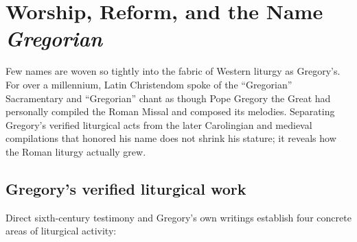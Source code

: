 \section{Worship, Reform, and the Name \emph{Gregorian}}

Few names are woven so tightly into the fabric of Western liturgy as Gregory's.
For over a millennium, Latin Christendom spoke of the ``Gregorian''
Sacramentary and ``Gregorian'' chant as though Pope Gregory the Great had
personally compiled the Roman Missal and composed its melodies. Separating
Gregory's verified liturgical acts from the later Carolingian and medieval
compilations that honored his name does not shrink his stature; it reveals how
the Roman liturgy actually grew.

\subsection{Gregory's verified liturgical work}

Direct sixth-century testimony and Gregory's own writings establish four
concrete areas of liturgical activity:


